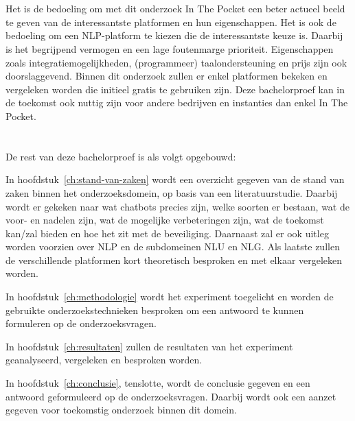 \section{}
\label{sec:onderzoeksdoelstelling}

Het is de bedoeling om met dit onderzoek In The Pocket een beter actueel beeld te geven van de interessantste platformen en hun eigenschappen. Het is ook de bedoeling om een NLP-platform te kiezen die de interessantste keuze is. Daarbij is het begrijpend vermogen en een lage foutenmarge prioriteit. Eigenschappen zoals integratiemogelijkheden, (programmeer) taalondersteuning en prijs zijn ook doorslaggevend. Binnen dit onderzoek zullen er enkel platformen bekeken en vergeleken worden die initieel gratis te gebruiken zijn. Deze bachelorproef kan in de toekomst ook nuttig zijn voor andere bedrijven en instanties dan enkel In The Pocket.

\newpage
\section{}
\label{sec:opzet-bachelorproef}


De rest van deze bachelorproef is als volgt opgebouwd:

In hoofdstuk~\ref{ch:stand-van-zaken} wordt een overzicht gegeven van de stand van zaken binnen het onderzoeksdomein, op basis van een literatuurstudie.  Daarbij wordt er gekeken naar wat chatbots precies zijn, welke soorten er bestaan, wat de voor- en nadelen zijn, wat de mogelijke verbeteringen zijn, wat de toekomst kan/zal bieden en hoe het zit met de beveiliging. Daarnaast zal er ook uitleg worden voorzien over NLP en de subdomeinen NLU en NLG. Als laatste zullen de verschillende platformen kort theoretisch besproken en met elkaar vergeleken worden.

In hoofdstuk~\ref{ch:methodologie} wordt het experiment toegelicht en worden de gebruikte onderzoekstechnieken besproken om een antwoord te kunnen formuleren op de onderzoeksvragen.

In hoofdstuk~\ref{ch:resultaten}  zullen de resultaten van het experiment geanalyseerd, vergeleken en besproken worden.

In hoofdstuk~\ref{ch:conclusie}, tenslotte, wordt de conclusie gegeven en een antwoord geformuleerd op de onderzoeksvragen. Daarbij wordt ook een aanzet gegeven voor toekomstig onderzoek binnen dit domein.









